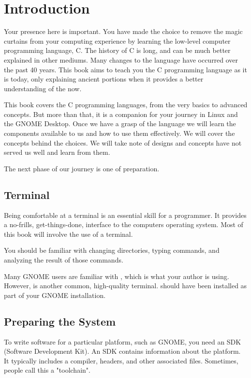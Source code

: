 \chapter{Introduction}

Your presence here is important. You have made the choice to remove the magic
curtains from your computing experience by learning the low-level computer
programming language, C. The history of C is long, and can be much better
explained in other mediums. Many changes to the language have occurred over
the past 40 years. This book aims to teach you the C programming language as
it is today, only explaining ancient portions when it provides a better
understanding of the now.

This book covers the C programming languages, from the very basics to advanced
concepts. But more than that, it is a companion for your journey in Linux and
the GNOME Desktop. Once we have a grasp of the language we will learn the
components available to us and how to use them effectively. We will cover the
concepts behind the choices. We will take note of designs and concepts have
not served us well and learn from them.

The next phase of our journey is one of preparation.


\section{Terminal}

Being comfortable at a terminal is an essential skill for a programmer. It
provides a no-frills, get-things-done, interface to the computers operating
system. Most of this book will involve the use of a terminal.

You should be familiar with changing directories, typing commands, and
analyzing the result of those commands.

Many GNOME users are familiar with , which is what your
author is using. However,  is another common, high-quality
terminal.  should have been installed as part of your
GNOME installation.


\section{Preparing the System}

To write software for a particular platform, such as GNOME, you need an SDK
(Software Development Kit). An SDK contains information about the platform. It
typically includes a compiler, headers, and other associated files. Sometimes,
people call this a "toolchain".

